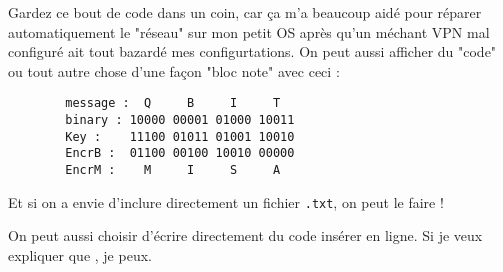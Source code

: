 Gardez ce bout de code dans un coin, car ça m'a beaucoup aidé pour réparer automatiquement le
"réseau" sur mon petit OS après qu'un méchant VPN mal configuré ait tout bazardé mes
configurtations.
\ideaEnd
On peut aussi afficher du "code" ou tout autre chose d'une façon "bloc note" avec ceci :
\begin{mycodebox}
    \begin{verbatim}
        message :  Q     B     I     T
        binary : 10000 00001 01000 10011
        Key :    11100 01011 01001 10010
        EncrB :  01100 00100 10010 00000
        EncrM :    M     I     S     A
    \end{verbatim}
\end{mycodebox}

Et si on a envie d'inclure directement un fichier \texttt{.txt}, on peut le faire !


On peut aussi choisir d'écrire directement du code insérer en ligne. Si je veux expliquer que
, je peux.

